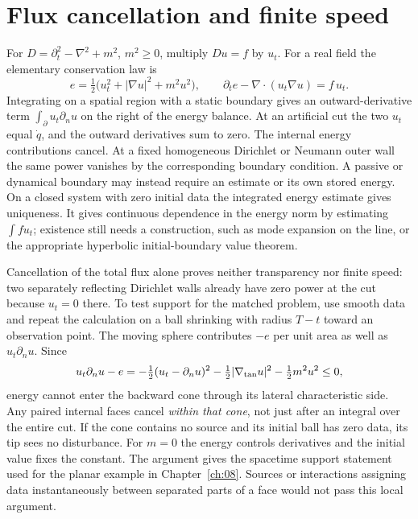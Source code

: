 \section{Flux cancellation and finite speed}
For $D=\partial_t^2-\nabla^2+m^2$, $m^2\geq0$, multiply $Du=f$ by $u_t$. For a real field the elementary conservation law is
\[
 e=\tfrac12\big(u_t^2+|\nabla u|^2+m^2u^2\big),\qquad
 \partial_t e-\nabla\!\cdot(u_t\nabla u)=f\,u_t .
\]
Integrating on a spatial region with a static boundary gives an outward-derivative term $\int_{\partial}u_t\partial_nu$ on the right of the energy balance. At an artificial cut the two $u_t$ equal $\dot q$, and the outward derivatives sum to zero. The internal energy contributions cancel. At a fixed homogeneous Dirichlet or Neumann outer wall the same power vanishes by the corresponding boundary condition. A passive or dynamical boundary may instead require an estimate or its own stored energy. On a closed system with zero initial data the integrated energy estimate gives uniqueness. It gives continuous dependence in the energy norm by estimating $\int f u_t$; existence still needs a construction, such as mode expansion on the line, or the appropriate hyperbolic initial-boundary value theorem.

Cancellation of the total flux alone proves neither transparency nor finite speed: two separately reflecting Dirichlet walls already have zero power at the cut because $u_t=0$ there. To test support for the matched problem, use smooth data and repeat the calculation on a ball shrinking with radius $T-t$ toward an observation point. The moving sphere contributes $-e$ per unit area as well as $u_t\partial_nu$. Since
\[
 u_t\partial_nu-e=-\tfrac12(u_t-\partial_nu)^2
                    -\tfrac12|\nabla_{\rm tan}u|^2-\tfrac12m^2u^2\leq0,
\]
energy cannot enter the backward cone through its lateral characteristic side. Any paired internal faces cancel \emph{within that cone}, not just after an integral over the entire cut. If the cone contains no source and its initial ball has zero data, its tip sees no disturbance. For $m=0$ the energy controls derivatives and the initial value fixes the constant. The argument gives the spacetime support statement used for the planar example in Chapter~\ref{ch:08}. Sources or interactions assigning data instantaneously between separated parts of a face would not pass this local argument.

